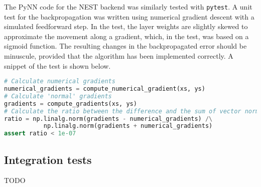 The PyNN code for the NEST backend was similarly tested with \texttt{pytest}.
A unit test for the backpropagation was written using numerical gradient descent
with a simulated feedforward step.
In the test, the layer weights are slightly skewed to approximate the movement
along a gradient, which, in the test, was based on a sigmoid function.
The resulting changes in the backpropagated error should be minuscule, provided
that the algorithm has been implemented correctly.
A snippet of the test is shown below.

\begin{minipage}{\linewidth}
\begin{lstlisting}[language=Python,label={lst:volrpynn_numerical},caption={Part
of the numerical gradient test for the densely connected layer in PyNN.}]
# Calculate numerical gradients
numerical_gradients = compute_numerical_gradient(xs, ys)
# Calculate 'normal' gradients
gradients = compute_gradients(xs, ys)
# Calculate the ratio between the difference and the sum of vector norms
ratio = np.linalg.norm(gradients - numerical_gradients) /\
           np.linalg.norm(gradients + numerical_gradients)
assert ratio < 1e-07
\end{lstlisting}
\end{minipage}

\subsection{Integration tests}
TODO
